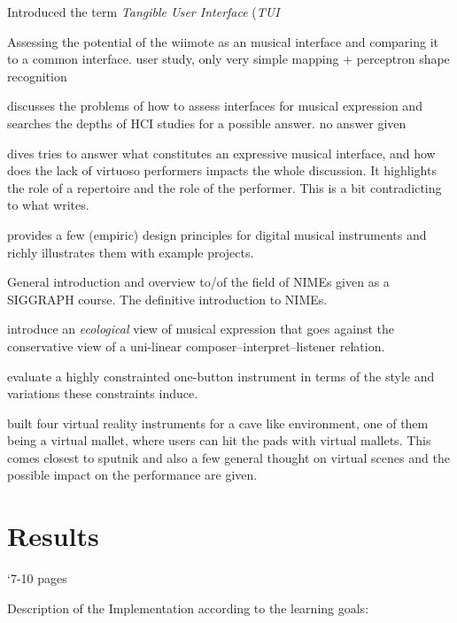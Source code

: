 \documentclass[10pt,a4paper]{scrartcl}
\begin{document}
\cite{Ishii1997} Introduced the term \emph{Tangible User Interface} (\emph{TUI}

\cite{Kiefer2008} Assessing the potential of the wiimote as an musical interface and comparing it to a common interface. user study, only very simple mapping + perceptron shape recognition

\cite{Wanderley2002} discusses the problems of how to assess interfaces for musical expression and searches the depths of HCI studies for a possible answer. no answer given

\cite{Dobrian2006} dives tries to answer what constitutes an expressive musical interface, and how does the lack of virtuoso performers impacts the whole discussion. It highlights the role of a repertoire and the role of the performer. This is a bit contradicting to what \cite{Magnusson2010} writes.

\cite{Cook2001} provides a few (empiric) design principles for digital musical instruments and richly illustrates them with example projects.

\cite{Fels2011} General introduction and overview to/of the field of NIMEs given as a SIGGRAPH course. The definitive introduction to NIMEs.

\cite{Gurevich2007} introduce an \emph{ecological} view of musical expression that goes against the conservative view of a uni-linear composer--interpret--listener relation.

\cite{Gurevich2010} evaluate a highly constrainted one-button instrument in terms of the style and variations these constraints induce.

\cite{Maki-Patola2005} built four virtual reality instruments for a cave like environment, one of them being a virtual mallet, where users can hit the pads with virtual mallets. This comes closest to sputnik and also a few general thought on virtual scenes and the possible impact on the performance are given.












\section{Results}
\label{sec:results}
`7-10 pages

Description of the Implementation according to the learning goals:
\end{document}
